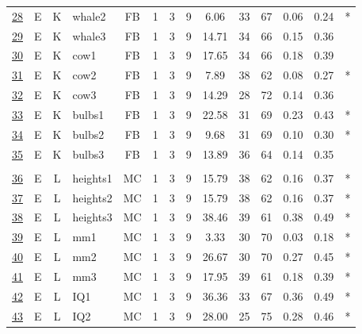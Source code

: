 \documentclass[12pt,nohyper]{tufte-handout}\usepackage[]{graphicx}\usepackage[]{color}
\begin{document}
\begin{longtable}{cccl|cccc|ccccc|l}
  \hyperlink{T06.E.K.09.3.1.FB.whale2.2}{28} & E & K & whale2 & FB &   1 &   3 &   9 & 6.06 &  33 &  67 & 0.06 & 0.24 & * \\ 
  \hyperlink{T06.E.K.09.3.1.FB.whale3.2}{29} & E & K & whale3 & FB &   1 &   3 &   9 & 14.71 &  34 &  66 & 0.15 & 0.36 &  \\ 
  \hyperlink{T06.E.K.09.3.1.FB.cow1.2}{30} & E & K & cow1 & FB &   1 &   3 &   9 & 17.65 &  34 &  66 & 0.18 & 0.39 &  \\ 
  \hyperlink{T06.E.K.09.3.1.FB.cow2.2}{31} & E & K & cow2 & FB &   1 &   3 &   9 & 7.89 &  38 &  62 & 0.08 & 0.27 & * \\ 
  \hyperlink{T06.E.K.09.3.1.FB.cow3.2}{32} & E & K & cow3 & FB &   1 &   3 &   9 & 14.29 &  28 &  72 & 0.14 & 0.36 &  \\ 
  \hyperlink{T06.E.K.09.3.1.FB.bulbs1.2}{33} & E & K & bulbs1 & FB &   1 &   3 &   9 & 22.58 &  31 &  69 & 0.23 & 0.43 & * \\ 
  \hyperlink{T06.E.K.09.3.1.FB.bulbs2.2}{34} & E & K & bulbs2 & FB &   1 &   3 &   9 & 9.68 &  31 &  69 & 0.10 & 0.30 & * \\ 
  \hyperlink{T06.E.K.09.3.1.FB.bulbs3.2}{35} & E & K & bulbs3 & FB &   1 &   3 &   9 & 13.89 &  36 &  64 & 0.14 & 0.35 &  \\ 
   &  &  &  &  &  &  &  &  &  &  &  &  &  \\ 
  \hyperlink{T06.E.L.09.3.1.MC.heights1.2}{36} & E & L & heights1 & MC &   1 &   3 &   9 & 15.79 &  38 &  62 & 0.16 & 0.37 & * \\ 
  \hyperlink{T06.E.L.09.3.1.MC.heights2.2}{37} & E & L & heights2 & MC &   1 &   3 &   9 & 15.79 &  38 &  62 & 0.16 & 0.37 & * \\ 
  \hyperlink{T06.E.L.09.3.1.MC.heights3.2}{38} & E & L & heights3 & MC &   1 &   3 &   9 & 38.46 &  39 &  61 & 0.38 & 0.49 & * \\ 
  \hyperlink{T06.E.L.09.3.1.MC.mm1.2}{39} & E & L & mm1 & MC &   1 &   3 &   9 & 3.33 &  30 &  70 & 0.03 & 0.18 & * \\ 
  \hyperlink{T06.E.L.09.3.1.MC.mm2.2}{40} & E & L & mm2 & MC &   1 &   3 &   9 & 26.67 &  30 &  70 & 0.27 & 0.45 & * \\ 
  \hyperlink{T06.E.L.09.3.1.MC.mm3.2}{41} & E & L & mm3 & MC &   1 &   3 &   9 & 17.95 &  39 &  61 & 0.18 & 0.39 & * \\ 
  \hyperlink{T06.E.L.09.3.1.MC.IQ1.2}{42} & E & L & IQ1 & MC &   1 &   3 &   9 & 36.36 &  33 &  67 & 0.36 & 0.49 & * \\ 
  \hyperlink{T06.E.L.09.3.1.MC.IQ2.2}{43} & E & L & IQ2 & MC &   1 &   3 &   9 & 28.00 &  25 &  75 & 0.28 & 0.46 & * \\ 

\end{longtable}
\end{document}
